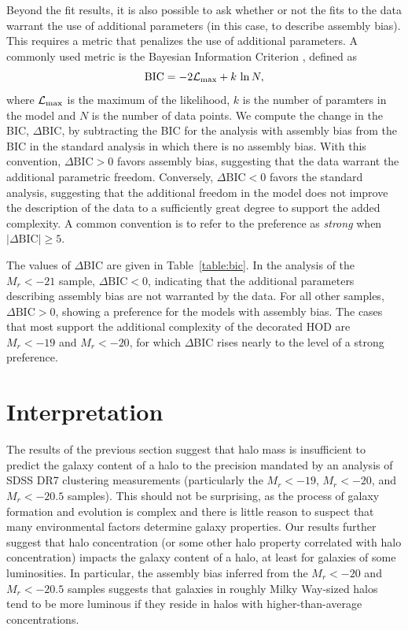 \documentclass[usenatbib,usegraphicx,letterpaper]{mn2e}
\newcommand{\magr}{M_r}
\begin{document}
Beyond the fit results, it is also possible to ask whether or not the fits to the data warrant the use of 
additional parameters (in this case, to describe assembly bias). This requires a metric that penalizes the 
use of additional parameters. A commonly used metric is the Bayesian Information Criterion 
\citep[BIC,][]{schwarz78}, defined as 
%
\begin{equation}
\mathrm{BIC} = -2 \mathcal{L}_{\rm max} + k\, \ln N, 
\end{equation}
%
where $\mathcal{L}_{\rm max}$ is the maximum of the likelihood, 
$k$ is the number of paramters in the model and $N$ is the number of 
data points. We compute the change in the BIC, $\Delta$BIC, by subtracting 
the BIC for the analysis with assembly bias from the BIC in the standard analysis 
in which there is no assembly bias. With this convention, $\Delta \mathrm{BIC} > 0$ 
favors assembly bias, suggesting that the data warrant the additional parametric freedom. 
Conversely, $\Delta \mathrm{BIC} < 0$ favors the standard analysis, 
suggesting that the additional freedom in the model does not improve the description of the data 
to a sufficiently great degree to support the added complexity. 
A common convention is to refer to the preference as 
{\em strong} when $\vert \Delta \mathrm{BIC}\vert \ge 5$. 

The values of $\Delta$BIC are given in Table~\ref{table:bic}. In the analysis of the $\magr < -21$ sample, 
$\Delta \mathrm{BIC} < 0$, indicating that the additional parameters describing assembly bias are not 
warranted by the data. For all other samples, $\Delta \mathrm{BIC} > 0$, showing a preference for 
the models with assembly bias. The cases that most support the additional complexity 
of the decorated HOD are $\magr < -19$ and $\magr < -20$, for which $\Delta$BIC 
rises nearly to the level of a {\rm strong} preference. 

\section{Interpretation}
\label{section:discussion}

The results of the previous section suggest that halo mass is insufficient to predict 
the galaxy content of a halo to the precision mandated by an analysis of SDSS DR7 
clustering measurements (particularly the $\magr < -19$, $\magr < -20$, and $\magr < -20.5$ samples). 
This should not be surprising, as the process of galaxy formation and evolution is complex and 
there is little reason to suspect that many environmental factors determine galaxy properties. 
Our results further suggest that halo concentration (or some other halo property correlated 
with halo concentration) impacts the galaxy content of a halo, at least for galaxies of some 
luminosities. In particular, the assembly bias inferred from the $\magr < -20$ and $\magr < -20.5$ 
samples suggests that galaxies in roughly Milky Way-sized halos tend to be more luminous 
if they reside in halos with higher-than-average concentrations. 
\end{document}
